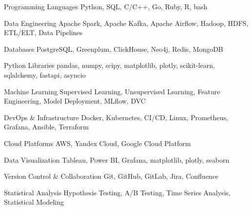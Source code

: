 

\begin{cvskills}

  \cvskill
    {Programming Languages} %
    {Python, SQL, C/C++, Go, Ruby, R, bash} %

  \cvskill
    {Data Engineering} %
    {Apache Spark, Apache Kafka, Apache Airflow, Hadoop, HDFS, ETL/ELT, Data Pipelines} %

  \cvskill
    {Databases} %
    {PostgreSQL, Greenplum, ClickHouse, Neo4j, Redis, MongoDB} %

  \cvskill
    {Python Libraries} %
    {pandas, numpy, scipy, matplotlib, plotly, scikit-learn, sqlalchemy, fastapi, asyncio} %

  \cvskill
    {Machine Learning} %
    {Supervised Learning, Unsupervised Learning, Feature Engineering, Model Deployment, MLflow, DVC} %

  \cvskill
    {DevOps \& Infrastructure} %
    {Docker, Kubernetes, CI/CD, Linux, Prometheus, Grafana, Ansible, Terraform} %

  \cvskill
    {Cloud Platforms} %
    {AWS, Yandex Cloud, Google Cloud Platform} %

  \cvskill
    {Data Visualization} %
    {Tableau, Power BI, Grafana, matplotlib, plotly, seaborn} %

  \cvskill
    {Version Control \& Collaboration} %
    {Git, GitHub, GitLab, Jira, Confluence} %

  \cvskill
    {Statistical Analysis} %
    {Hypothesis Testing, A/B Testing, Time Series Analysis, Statistical Modeling} %

\end{cvskills}
